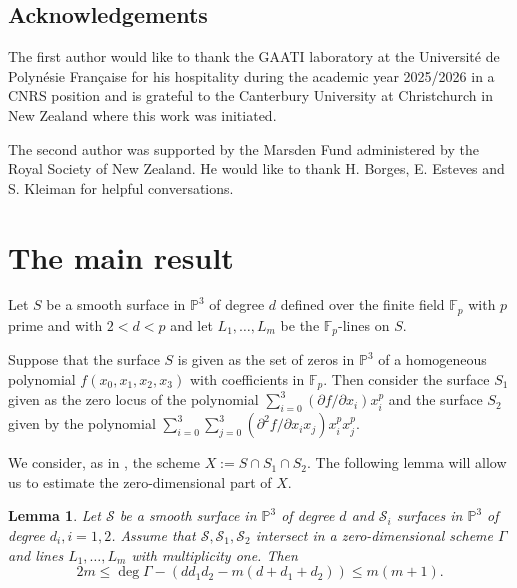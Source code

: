 \documentclass[12pt]{amsart}
\newtheorem{lemma}{Lemma}[section]
\theoremstyle{definition}
\newcommand{\PP}{{\mathbb P}}
\newcommand{\calS}{{\mathcal S}}
\def\PP{\mathbb{P}}
\begin{document}
\subsection*{Acknowledgements}
The first author would like to thank the GAATI laboratory at the Universit\'e de Polyn\'esie Fran\c caise for his hospitality during the academic year 2025/2026 in a CNRS position and is grateful to the Canterbury University at Christchurch in New Zealand where this work was initiated.

The second author was supported by the Marsden Fund administered by the Royal
Society of New Zealand. He would like to thank H. Borges, E. Esteves and S. Kleiman for helpful conversations.



\section{The main result}

Let $S$ be a smooth surface in $\PP^3$ of degree $d$ defined over the finite field ${\mathbb F}_p$ with $p$ prime and with $2<d<p$
and let $L_1,\ldots, L_m$ be the ${\mathbb F}_p$-lines on $S$.

Suppose that the surface $S$ is given as the set of zeros in ${\mathbb P}^3$ of a homogeneous polynomial $f(x_0,x_1,x_2,x_3)$ with coefficients in ${\mathbb F}_p$. Then consider the surface $S_1$ given as the zero locus of the polynomial $\sum_{i=0}^3(\partial f/\partial x_i)x_i^p$ and the surface $S_2$ given by the polynomial
$\sum_{i=0}^3\sum_{j=0}^3(\partial^2 f/\partial x_ix_j)x_i^px_j^p$. 

We consider, as in \cite{Voloch}, the scheme $X:=S\cap S_1\cap S_2$.
The following lemma will allow us to estimate the zero-dimensional part of $X$.


\begin{lemma}\label{Fondamental_Lemma}
    Let $\calS$ be a smooth surface in $\PP^3$ of degree $d$ and $\calS_i$ surfaces in $\PP^3$ of degree $d_i, i=1,2$. Assume that $\calS,\calS_1,\calS_2$ intersect in a zero-dimensional scheme $\Gamma$ and lines $L_1,\ldots,L_m$ with multiplicity one. Then
    $$2m \le \deg \Gamma - (dd_1d_2 -m(d+d_1+d_2)) \le m(m+1).$$
\end{lemma}
\end{document}
